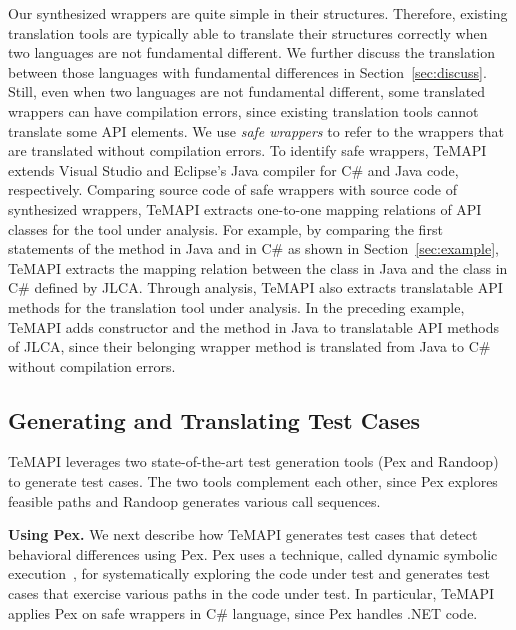 Our synthesized wrappers are quite simple in their structures. Therefore, existing translation tools are typically able to translate their structures correctly when two languages are not fundamental different. We further discuss the translation between those languages with fundamental differences in Section~\ref{sec:discuss}. Still, even when two languages are not fundamental different, some translated wrappers can have compilation errors, since existing translation tools cannot translate some API elements. We use \emph{safe wrappers} to refer to the wrappers that are translated without compilation errors. To identify safe wrappers, TeMAPI extends Visual Studio and Eclipse's Java compiler for C\# and Java code, respectively. Comparing source code of safe wrappers with source code of synthesized wrappers, TeMAPI extracts one-to-one mapping relations of API classes for the tool under analysis. For example, by comparing the first statements of the  method in Java and in C\# as shown in Section~\ref{sec:example}, TeMAPI extracts the mapping relation between the  class in Java and the  class in C\# defined by JLCA. Through analysis, TeMAPI also extracts translatable API methods for the translation tool under analysis. In the preceding example, TeMAPI adds  constructor and the  method in Java to translatable API methods of JLCA, since their belonging wrapper method is translated from Java to C\# without compilation errors.

\subsection{Generating and Translating Test Cases}
\label{sec:approach:single}
TeMAPI leverages two state-of-the-art test generation tools (Pex and Randoop) to generate test cases. The two tools complement each other, since Pex explores feasible paths and Randoop generates various call sequences.

\textbf{Using Pex.} We next describe how TeMAPI generates test cases that detect behavioral differences using Pex. Pex uses a technique, called dynamic symbolic execution~\cite{koushik:cute, godefroid:dart}, for systematically exploring the code under test and generates test cases that exercise various paths in the code under test. In particular, TeMAPI applies Pex on safe wrappers in C\# language, since Pex handles .NET code.

